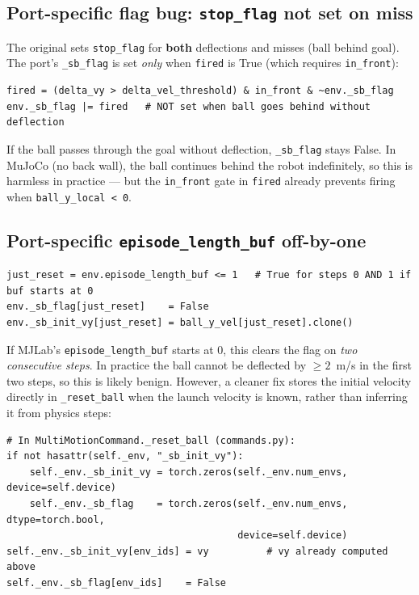 \documentclass[11pt,a4paper]{article}
\begin{document}
\subsection{Port-specific flag bug: \texttt{stop\_flag} not set on miss}
\label{subsec:miss-flag}

The original sets \texttt{stop\_flag} for \textbf{both} deflections and misses
(ball behind goal). The port's \texttt{\_sb\_flag} is set \emph{only} when
\texttt{fired} is True (which requires \texttt{in\_front}):

\begin{lstlisting}[caption={Port: flag set only on deflection (potential gap)}]
fired = (delta_vy > delta_vel_threshold) & in_front & ~env._sb_flag
env._sb_flag |= fired   # NOT set when ball goes behind without deflection
\end{lstlisting}

If the ball passes through the goal without deflection, \texttt{\_sb\_flag}
stays False. In MuJoCo (no back wall), the ball continues behind the robot
indefinitely, so this is harmless in practice --- but the \texttt{in\_front}
gate in \texttt{fired} already prevents firing when \texttt{ball\_y\_local < 0}.

\subsection{Port-specific \texttt{episode\_length\_buf} off-by-one}
\label{subsec:off-by-one}

\begin{lstlisting}[caption={Port reset logic in stopball}]
just_reset = env.episode_length_buf <= 1   # True for steps 0 AND 1 if buf starts at 0
env._sb_flag[just_reset]    = False
env._sb_init_vy[just_reset] = ball_y_vel[just_reset].clone()
\end{lstlisting}

If MJLab's \texttt{episode\_length\_buf} starts at 0, this clears the flag on
\emph{two consecutive steps}. In practice the ball cannot be deflected by
$\geq 2$~m/s in the first two steps, so this is likely benign. However, a
cleaner fix stores the initial velocity directly in \texttt{\_reset\_ball}
when the launch velocity is known, rather than inferring it from physics steps:

\begin{lstlisting}[caption={Recommended fix: store initial vy at reset time}]
# In MultiMotionCommand._reset_ball (commands.py):
if not hasattr(self._env, "_sb_init_vy"):
    self._env._sb_init_vy = torch.zeros(self._env.num_envs, device=self.device)
    self._env._sb_flag    = torch.zeros(self._env.num_envs, dtype=torch.bool,
                                        device=self.device)
self._env._sb_init_vy[env_ids] = vy          # vy already computed above
self._env._sb_flag[env_ids]    = False
\end{lstlisting}
\end{document}
